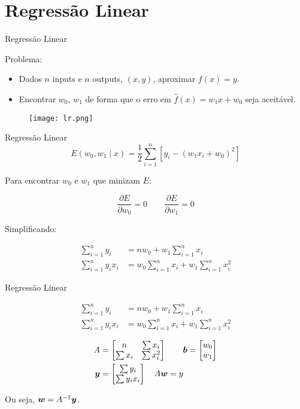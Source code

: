 \section{Regressão Linear}

\begin{frame}{Regressão Linear}
  \begin{block}{Problema:}
    \begin{itemize}
      \item Dados $n$ inputs e $n$ outputs, $(x,y)$, aproximar $f(x) = y$.
      \item Encontrar $w_0$, $w_1$ de forma que o erro em $\hat{f}(x) = w_1 x + w_0$ seja aceitável.
    \end{itemize}
  \end{block}

  \begin{figure}[t]
    \texttt{[image: lr.png]}
    \centering
  \end{figure}

\end{frame}

\begin{frame}{Regressão Linear}
  \[ E(w_0, w_1 \mid x) = \frac{1}{2} \sum_{i=1}^{n} \left[y_i - (w_1 x_i + w_0)^2 \right] \]

  Para encontrar $w_0$ e $w_1$ que minizam $E$:

  \[ \frac{\partial E}{\partial w_0} = 0 \qquad \frac{\partial E}{\partial w_1} = 0 \]

  Simplificando:

  \begin{align*}
    \sum_{i=1}^{n} y_i &= n w_0 + w_1 \sum_{i=1}^{n} x_i\\
    \sum_{i=1}^{n} y_i x_i &= w_0 \sum_{i=1}^{n} x_i + w_1 \sum_{i=1}^{n} x_i^2
  \end{align*}
\end{frame}

\begin{frame}{Regressão Linear}

  \begin{align*}
    \sum_{i=1}^{n} y_i &= n w_0 + w_1 \sum_{i=1}^{n} x_i\\
    \sum_{i=1}^{n} y_i x_i &= w_0 \sum_{i=1}^{n} x_i + w_1 \sum_{i=1}^{n} x_i^2
  \end{align*}

  \begin{align*}
    A &= \begin{bmatrix}
      n & \sum x_i \\
      \sum x_i & \sum x_i^2
    \end{bmatrix} \qquad \boldsymbol{b} = \begin{bmatrix} w_0 \\ w_1 \end{bmatrix} \\
    \boldsymbol{y} &= \begin{bmatrix} \sum y_i \\ \sum y_i x_i \end{bmatrix} \quad A \boldsymbol{w} = y
  \end{align*}

  Ou seja, $ \boldsymbol{w} = A^{-1} \boldsymbol{y} $.
\end{frame}

